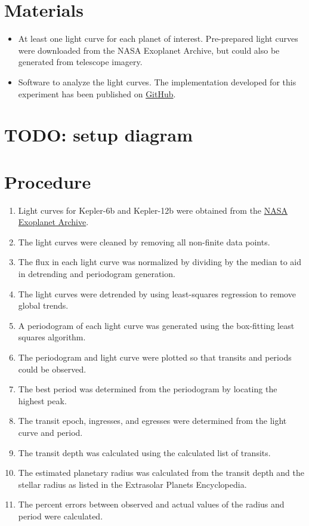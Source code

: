 \section{Materials}

\begin{itemize}
    \item At least one light curve for each planet of interest. Pre-prepared light curves were downloaded from the NASA Exoplanet Archive, but could
        also be generated from telescope imagery. \autocite{exoplanetArchive}
    \item Software to analyze the light curves. The implementation developed for this experiment has been published on \href{https://github.com/roguePanda/exoplanet-project}{GitHub}.
\end{itemize}

\section{TODO: setup diagram}

\section{Procedure}

\begin{enumerate}
    \item Light curves for Kepler-6b and Kepler-12b were obtained from the \href{http://exoplanetarchive.ipac.caltech.edu/}{NASA Exoplanet Archive}.
    \item The light curves were cleaned by removing all non-finite data points.
    \item The flux in each light curve was normalized by dividing by the median to aid in detrending and periodogram generation.
    \item The light curves were detrended by using least-squares regression to remove global trends. \autocite{untrendy}
    \item A periodogram of each light curve was generated using the box-fitting least squares algorithm. \autocite{bls, pythonBls}
    \item The periodogram and light curve were plotted so that transits and periods could be observed.
    \item The best period was determined from the periodogram by locating the highest peak.
    \item The transit epoch, ingresses, and egresses were determined from the light curve and period.
    \item The transit depth was calculated using the calculated list of transits.
    \item The estimated planetary radius was calculated from the transit depth and the stellar radius as listed in the Extrasolar Planets Encyclopedia. \autocite{exoplanetEncyclopedia}
    \item The percent errors between observed and actual values of the radius and period were calculated.
\end{enumerate}
